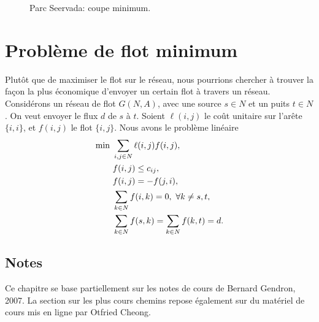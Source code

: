 \begin{figure}[htbp]
\begin{center}
\caption{Parc Seervada: coupe minimum.}
\label{fig:seervada_coupe}
\end{center}
\end{figure}

\section{Problème de flot minimum}

Plutôt que de maximiser le flot sur le réseau, nous pourrions chercher à trouver la façon la plus économique d'envoyer un certain flot à travers un réseau.
Considérons un réseau de flot $G(N,A)$, avec une source $s \in N$ et un puits $t \in N$. On veut envoyer le flux $d$ de $s$ à $t$.
Soient $\ell(i,j)$ le coût unitaire sur l'arête $\lbrace i, i \rbrace$, et $f(i,j)$ le flot $\lbrace i, j \rbrace$.
Nous avons le problème linéaire
\begin{align*}
\min\ &\sum_{i,j \in N} \ell(i,j)f(i,j), \\
\sc{}\ & f(i,j) \leq c_{ij}, \\
& f(i,j) = -f(j,i), \\
& \sum_{k \in N} f(i,k) = 0,\ \forall k \ne s,t,\\
& \sum_{k \in N} f(s,k) = \sum_{k \in N} f(k,t) = d.\\
\end{align*}

\begin{small}
\section{Notes}

Ce chapitre se base partiellement sur les notes de cours de Bernard Gendron, 2007.
La section sur les plus cours chemins repose également sur du matériel de cours mis en ligne par Otfried Cheong.

\end{small}
